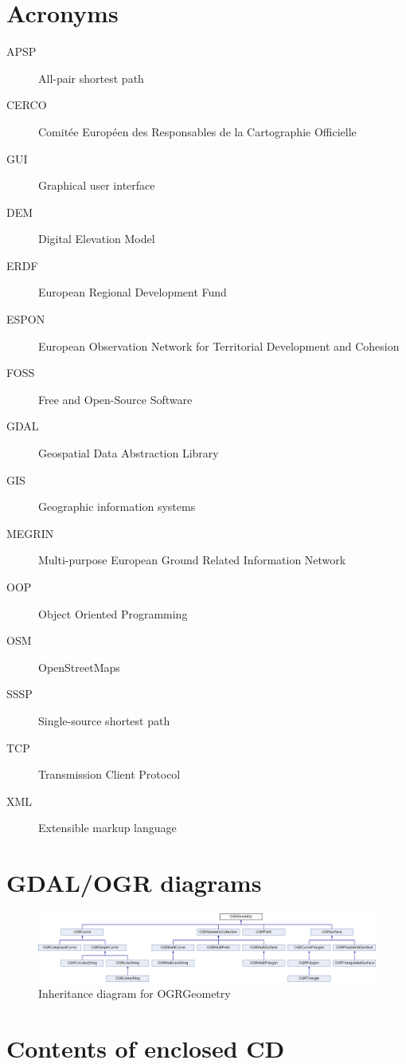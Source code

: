 \documentclass[thesis=M,english]{FITthesis}[2012/10/20]
\begin{document}
\chapter{Acronyms}
\begin{description}
	\item[APSP] All-pair shortest path
	\item[CERCO] Comit{\' e}e Europ{\' e}en des Responsables de la Cartographie Officielle\item[GUI] Graphical user interface
	\item[DEM] Digital Elevation Model
	\item[ERDF] European Regional Development Fund
	\item[ESPON] European Observation Network for Territorial Development and Cohesion
	\item[FOSS] Free and Open-Source Software
	\item[GDAL] Geospatial Data Abstraction Library
	\item[GIS] Geographic information systems	
	\item[MEGRIN] Multi-purpose European Ground Related Information Network
	\item[OOP] Object Oriented Programming
	\item[OSM] OpenStreetMaps
	\item[SSSP] Single-source shortest path
	\item[TCP] Transmission Client Protocol
	\item[XML] Extensible markup language
	
	
\end{description}

\chapter{GDAL/OGR diagrams}


\begin{figure}[H]
\centering
\includegraphics[width=1\textwidth]{pics/classOGRGeometry}
\caption{Inheritance diagram for OGRGeometry}
\label{pic:OGRGeo}
\end{figure}


\chapter{Contents of enclosed CD}
\end{document}
